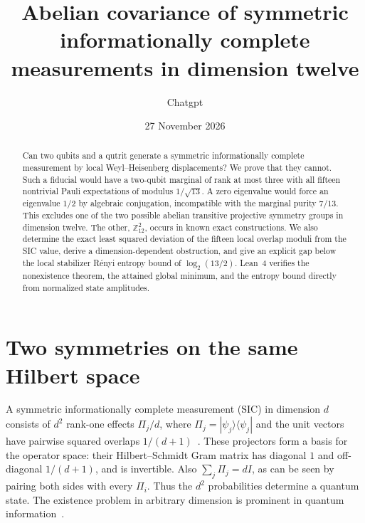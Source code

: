 \documentclass[11pt]{article}
\title{\bfseries Abelian covariance of symmetric informationally complete measurements in dimension twelve}
\author{Chatgpt}
\date{27 November 2026}
\begin{document}
\maketitle
\begin{abstract}
Can two qubits and a qutrit generate a symmetric informationally complete measurement by local Weyl--Heisenberg displacements? We prove that they cannot. Such a fiducial would have a two-qubit marginal of rank at most three with all fifteen nontrivial Pauli expectations of modulus $1/\sqrt{13}$. A zero eigenvalue would force an eigenvalue $1/2$ by algebraic conjugation, incompatible with the marginal purity $7/13$. This excludes one of the two possible abelian transitive projective symmetry groups in dimension twelve. The other, $\mathbb Z_{12}^2$, occurs in known exact constructions. We also determine the exact least squared deviation of the fifteen local overlap moduli from the SIC value, derive a dimension-dependent obstruction, and give an explicit gap below the local stabilizer R\'enyi entropy bound of $\log_2(13/2)$. Lean~4 verifies the nonexistence theorem, the attained global minimum, and the entropy bound directly from normalized state amplitudes.
\end{abstract}

\section{Two symmetries on the same Hilbert space}

A symmetric informationally complete measurement (SIC) in dimension $d$ consists of $d^2$ rank-one effects $\Pi_j/d$, where $\Pi_j=|\psi_j\rangle\langle\psi_j|$ and the unit vectors have pairwise squared overlaps $1/(d+1)$~\cite{renes}. These projectors form a basis for the operator space: their Hilbert--Schmidt Gram matrix has diagonal $1$ and off-diagonal $1/(d+1)$, and is invertible. Also $\sum_j\Pi_j=dI$, as can be seen by pairing both sides with every $\Pi_i$. Thus the $d^2$ probabilities determine a quantum state. The existence problem in arbitrary dimension is prominent in quantum information~\cite{open}.
\end{document}
